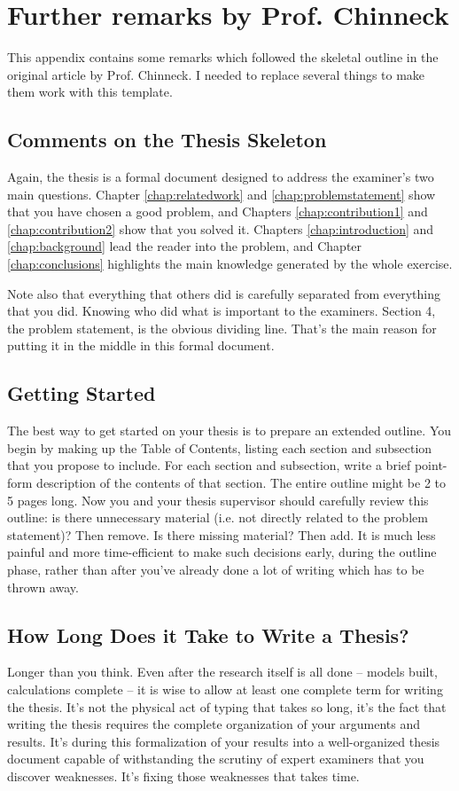 \chapter{Further remarks by Prof. Chinneck}
\label{app:b}
This appendix contains some remarks which followed the skeletal outline in the
original article by Prof. Chinneck. I needed to replace several things to make
them work with this template.

\section{Comments on the Thesis Skeleton}
Again, the thesis is a formal document designed to address the examiner's two
main questions. Chapter \ref{chap:relatedwork} and \ref{chap:problemstatement}
show that you have chosen a good problem, and Chapters
\ref{chap:contribution1} and \ref{chap:contribution2} show that you solved it.
Chapters \ref{chap:introduction} and \ref{chap:background} lead the reader
into the problem, and Chapter \ref{chap:conclusions} highlights the main
knowledge generated by the whole exercise.

Note also that everything that others did is carefully separated from
everything that you did. Knowing who did what is important to the examiners.
Section 4, the problem statement, is the obvious dividing line. That's the
main reason for putting it in the middle in this formal document.

\section{Getting Started}
The best way to get started on your thesis is to prepare an extended outline.
You begin by making up the Table of Contents, listing each section and
subsection that you propose to include. For each section and subsection, write
a brief point-form description of the contents of that section. The entire
outline might be 2 to 5 pages long. Now you and your thesis supervisor should
carefully review this outline: is there unnecessary material (i.e. not
directly related to the problem statement)? Then remove. Is there missing
material? Then add. It is much less painful and more time-efficient to make
such decisions early, during the outline phase, rather than after you've
already done a lot of writing which has to be thrown away.  


\section{How Long Does it Take to Write a Thesis?}
Longer than you think. Even after the research itself is all done -- models
built, calculations complete -- it is wise to allow at least one complete term
for writing the thesis. It's not the physical act of typing that takes so
long, it's the fact that writing the thesis requires the complete organization
of your arguments and results. It's during this formalization of your results
into a well-organized thesis document capable of withstanding the scrutiny of
expert examiners that you discover weaknesses. It's fixing those weaknesses
that takes time.


